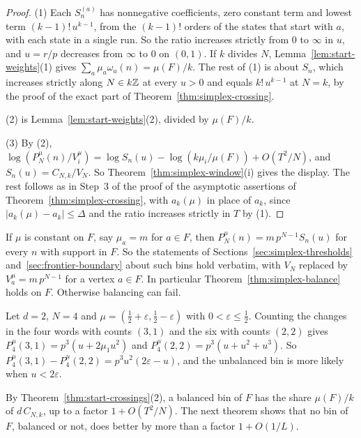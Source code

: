 \begin{proof}
(1) Each $S^{(a)}_n$ has nonnegative coefficients, zero constant term and lowest
term $(k-1)!\,u^{k-1}$, from the $(k-1)!$ orders of the states that start with
$a$, with each state in a single run. So the ratio increases strictly from $0$
to $\infty$ in $u$, and $u=r/p$ decreases from $\infty$ to $0$ on $(0,1)$. If
$k$ divides $N$, Lemma~\ref{lem:start-weights}(1) gives
$\sum_a\mu_a\omega_a(n)=\mu(F)/k$. The rest of (1) is about $S_n$, which
increases strictly along $N\in k\mathbb Z$ at every $u>0$ and equals $k!\,u^{k-1}$ at
$N=k$, by the proof of the exact part of Theorem~\ref{thm:simplex-crossing}.

(2) is Lemma~\ref{lem:start-weights}(2), divided by $\mu(F)/k$.

(3) By (2), $\log(P^\mu_N(n)/V^\mu_i)=\log S_n(u)-\log(k\mu_i/\mu(F))+O(T^2/N)$,
and $S_n(u)=C_{N,k}/V_N$. So Theorem~\ref{thm:simplex-window}(i) gives the
display. The rest follows as in Step~3 of the proof of the asymptotic
assertions of Theorem~\ref{thm:simplex-crossing}, with $a_k(\mu)$ in place of
$a_k$, since $|a_k(\mu)-a_k|\le\Delta$ and the ratio increases strictly in $T$
by (1).
\end{proof}

If $\mu$ is constant on $F$, say $\mu_a=m$ for $a\in F$, then
$P^\mu_N(n)=m\,p^{N-1}S_n(u)$ for every $n$ with support in $F$. So the
statements of Sections~\ref{sec:simplex-thresholds}
and~\ref{sec:frontier-boundary} about such bins hold verbatim, with $V_N$
replaced by $V^\mu_a=m\,p^{N-1}$ for a vertex $a\in F$. In particular
Theorem~\ref{thm:simplex-balance} holds on $F$. Otherwise balancing can fail.

\begin{example}\label{ex:start-balance}
Let $d=2$, $N=4$ and $\mu=(\frac12+\varepsilon,\frac12-\varepsilon)$ with
$0<\varepsilon\le\frac12$. Counting the changes in the four words with counts
$(3,1)$ and the six with counts $(2,2)$ gives $P^\mu_4(3,1)=p^3(u+2\mu_1u^2)$
and $P^\mu_4(2,2)=p^3(u+u^2+u^3)$. So
$P^\mu_4(3,1)-P^\mu_4(2,2)=p^3u^2(2\varepsilon-u)$, and the unbalanced bin is
more likely when $u<2\varepsilon$.
\end{example}

By Theorem~\ref{thm:start-crossings}(2), a balanced bin of $F$ has the share
$\mu(F)/k$ of $d\,C_{N,k}$, up to a factor $1+O(T^2/N)$. The next theorem shows
that no bin of $F$, balanced or not, does better by more than a factor
$1+O(1/L)$.


